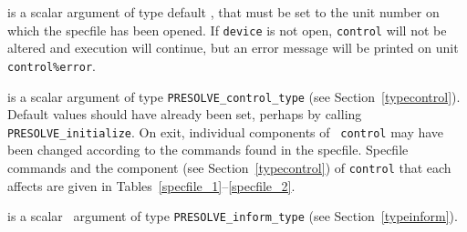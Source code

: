 \documentclass{galahad}
\newcommand{\packagename}{PRESOLVE}
\begin{document}
\begin{description}
 is a scalar \intentin argument of type default \integer,
that must be set to the unit number on which the specfile
has been opened. If {\tt device} is not open, {\tt control} will
not be altered and execution will continue, but an error message
will be printed on unit {\tt control\%error}.

 is a scalar \intentinout argument of type 
{\tt \packagename\_control\_type} (see Section~\ref{typecontrol}). 
Default values should have already been set, perhaps by calling 
{\tt \packagename\_initialize}. On exit, individual components of {\tt
control} may have been changed according to the commands found in the
specfile. Specfile commands and  the component (see Section~\ref{typecontrol})
of {\tt control}  that each affects are given in
Tables~\ref{specfile_1}--\ref{specfile_2}.

 is a scalar \intentout\ argument of type 
{\tt \packagename\_inform\_type} (see Section~\ref{typeinform}).
\end{description}
\end{document}
